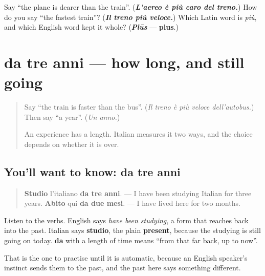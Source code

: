 \begin{tcolorbox}[breakable,colback=teal!4,colframe=teal!35!black,title={Before you move on}]
Say \textquotedblleft{}the plane is dearer than the train\textquotedblright{}. (\emph{\textbf{L'aereo è più caro del treno.}}) How do you say \textquotedblleft{}the fastest train\textquotedblright{}? (\emph{\textbf{Il treno più veloce.}}) Which Latin word is \emph{più}, and which English word kept it whole? (\emph{\textbf{Plūs}} — \textbf{plus}.)
\end{tcolorbox}
\section[da tre anni]{da tre anni — how long, and still going}

\label{lesson:IT-C270-da-tre-anni}



\begin{quote}
Say \textquotedblleft{}the train is faster than the bus\textquotedblright{}. (\emph{Il treno è più veloce dell'autobus.}) Then say \textquotedblleft{}a year\textquotedblright{}. (\emph{Un anno.})

An experience has a length. Italian measures it two ways, and the choice depends on whether it is over.
\end{quote}

\subsection*{You'll want to know: da tre anni}
\begin{quote}
\textbf{Studio} l'italiano \textbf{da tre anni}. — I have been studying Italian for three years. \textbf{Abito} qui \textbf{da due mesi}. — I have lived here for two months.
\end{quote}

Listen to the verbs. English says \emph{have been studying}, a form that reaches back into the past. Italian says \textbf{studio}, the plain \textbf{present}, because the studying is still going on today. \textbf{da} with a length of time means \textquotedblleft{}from that far back, up to now\textquotedblright{}.

That is the one to practise until it is automatic, because an English speaker's instinct sends them to the past, and the past here says something different.

